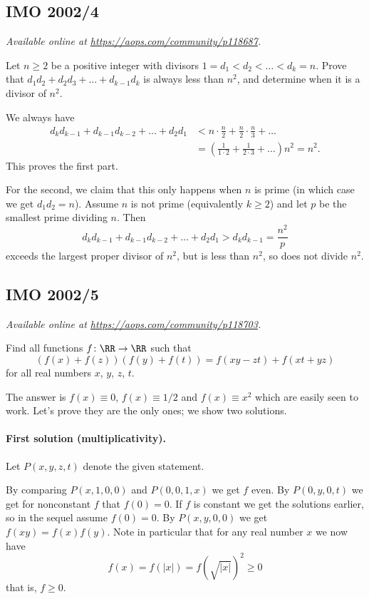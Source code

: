 \documentclass[11pt]{scrartcl}
\begin{document}
\subsection{IMO 2002/4}
\textsl{Available online at \url{https://aops.com/community/p118687}.}
\begin{mdframed}[style=mdpurplebox,frametitle={Problem statement}]
Let $n \ge 2$ be a positive integer
with divisors $1 = d_1 < d_2 < \dots < d_k = n$.
Prove that $d_1d_2 + d_2d_3 + \dots + d_{k-1} d_k$ is always less than $n^2$,
and determine when it is a divisor of $n^2$.
\end{mdframed}
We always have
\begin{align*}
  d_k d_{k-1} + d_{k-1} d_{k-2} + \dots + d_2 d_1
  &< n \cdot \frac n2 + \frac n2 \cdot \frac n3 + \dots \\
  &= \left( \frac{1}{1 \cdot 2} + \frac{1}{2 \cdot 3} + \dots \right) n^2 = n^2.
\end{align*}
This proves the first part.

For the second, we claim that this only happens
when $n$ is prime (in which case we get $d_1 d_2 = n$).
Assume $n$ is not prime (equivalently $k \ge 2$)
and let $p$ be the smallest prime dividing $n$.
Then
\[ d_k d_{k-1} + d_{k-1} d_{k-2} + \dots + d_2 d_1
  > d_k d_{k-1} = \frac{n^2}{p} \]
exceeds the largest proper divisor of $n^2$,
but is less than $n^2$, so does not divide $n^2$.
\pagebreak

\subsection{IMO 2002/5}
\textsl{Available online at \url{https://aops.com/community/p118703}.}
\begin{mdframed}[style=mdpurplebox,frametitle={Problem statement}]
Find all functions $f \colon \RR \to \RR$ such that
\[ \left(f(x)+f(z)\right)\left(f(y)+f(t)\right)
  = f(xy-zt)+f(xt+yz) \]
for all real numbers $x$, $y$, $z$, $t$.
\end{mdframed}
The answer is $f(x) \equiv 0$, $f(x) \equiv 1/2$
and $f(x) \equiv x^2$ which are easily seen to work.
Let's prove they are the only ones;
we show two solutions.

\paragraph{First solution (multiplicativity).}
Let $P(x,y,z,t)$ denote the given statement.
\begin{itemize}
  \ii By comparing $P(x,1,0,0)$ and $P(0,0,1,x)$
  we get $\boxed{f \text{ even}}$.
  \ii By $P(0,y,0,t)$ we get for nonconstant $f$
  that $f(0) = 0$.
  If $f$ is constant we get the solutions earlier,
  so in the sequel assume $\boxed{f(0) = 0}$.
  \ii By $P(x,y,0,0)$ we get $\boxed{f(xy) = f(x) f(y)}$.
  Note in particular that for any real number $x$ we now have
  \[ f(x) = f(|x|) = f\left( \sqrt{|x|} \right)^2 \ge 0 \]
  that is, $f \ge 0$.
\end{itemize}
\end{document}
